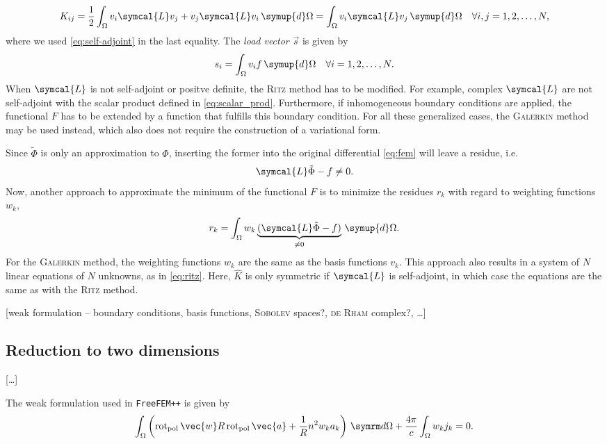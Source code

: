 \begin{gather}
  K_{ij} = \frac{1}{2} \int_{\Omega} v_{i} \symcal{L} v_{j} + v_{j} \symcal{L} v_{i} \, \symup{d} \Omega = \int_{\Omega} v_{i} \symcal{L} v_{j} \, \symup{d} \Omega \quad \forall i, j = 1, 2, \dotsc, N,
\end{gather}
where we used \cref{eq:self-adjoint} in the last equality. The \emph{load vector} $\vec{s}$ is given by
\begin{gather}
  s_{i} = \int_{\Omega} v_{i} f \, \symup{d} \Omega \quad \forall i = 1, 2, \dotsc, N.
\end{gather}
When $\symcal{L}$ is not self-adjoint or positve definite, the \textsc{Ritz} method has to be modified. For example, complex $\symcal{L}$ are not self-adjoint with the scalar product defined in \cref{eq:scalar_prod}. Furthermore, if inhomogeneous boundary conditions are applied, the functional $F$ has to be extended by a function that fulfills this boundary condition. For all these generalized cases, the \textsc{Galerkin} method may be used instead, which also does not require the construction of a variational form.

Since $\tilde{\Phi}$ is only an approximation to $\Phi$, inserting the former into the original differential \cref{eq:fem} will leave a residue, i.e.
\begin{gather}
  \symcal{L} \tilde{\Phi} - f \neq 0.
\end{gather}
Now, another approach to approximate the minimum of the functional $F$ is to minimize the residues $r_{k}$ with regard to weighting functions $w_{k}$,
\begin{gather}
  r_{k} = \int_{\Omega} w_{k} \underbrace{(\symcal{L} \tilde{\Phi} - f)}_{\neq 0} \, \symup{d} \Omega.
\end{gather}
For the \textsc{Galerkin} method, the weighting functions $w_{k}$ are the same as the basis functions $v_{k}$. This approach also results in a system of $N$ linear equations of $N$ unknowns, as in \cref{eq:ritz}. Here, $\hat{K}$ is only symmetric if $\symcal{L}$ is self-adjoint, in which case the equations are the same as with the \textsc{Ritz} method.

[weak formulation -- boundary conditions, basis functions, \textsc{Sobolev} spaces?, \textsc{de Rham} complex?, \ldots]

\subsection{Reduction to two dimensions}
\label{sec:fourier-fem}

[\ldots]

The weak formulation used in \texttt{FreeFEM++} is given by  %
\begin{gather}
  \int_{\Omega} \left ( \polCurl \vec{w} R \polCurl \vec{a} + \frac{1}{R} n^{2} w_{k} a_{k} \right ) \, \diff \Omega + \frac{4 \pi}{c} \int_{\Omega} w_{k} j_{k} = 0.
\end{gather}

